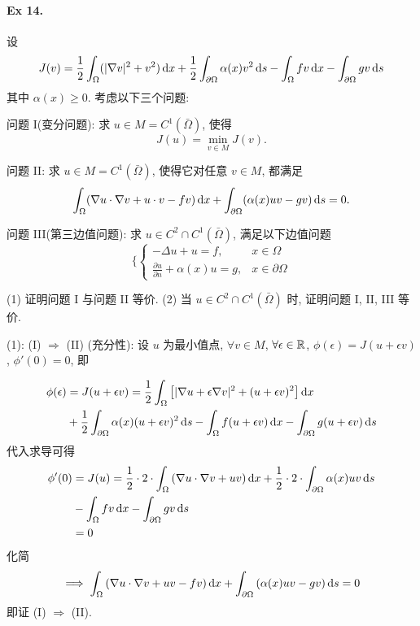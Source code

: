 \paragraph{Ex 14.}
设
\[
J(v) = \frac{1}{2} \int_{\Omega} (|\nabla v|^2 + v^2)\operatorname{d\!} x
+ \frac{1}{2} \int_{\partial \Omega} \alpha(x) v^2 \operatorname{d\!} s
- \int_{\Omega} fv \operatorname{d\!} x - \int_{\partial \Omega} gv \operatorname{d\!} s
\]
其中 $\alpha(x) \geq 0$. 考虑以下三个问题:

问题 I(变分问题): 求 $u \in M = C^1(\bar \Omega)$, 使得
\[
J(u)= \min_{v \in M} J(v).
\]

问题 II: 求 $u \in M = C^1(\bar \Omega)$, 使得它对任意 $v \in M$, 都满足
\[
\int_{\Omega} (\nabla u \cdot \nabla v + u \cdot v - fv)\operatorname{d\!} x
+ \int_{\partial \Omega} (\alpha(x) uv-gv )\operatorname{d\!} s = 0.
\]

问题 III(第三边值问题): 求 $u \in C^2 \cap C^1(\bar \Omega)$, 满足以下边值问题
\[\{
\begin{cases}
- \Delta u + u = f, & x \in \Omega \\
\frac{\partial u}{\partial n} + \alpha (x) u = g, & x \in \partial \Omega
\end{cases}
\]

(1) 证明问题 I 与问题 II 等价.
(2) 当 $u \in C^2 \cap C^1(\bar \Omega)$ 时, 证明问题 I, II, III 等价.

\solproof (1): (I) $\Rightarrow$ (II) (充分性):
设 $u$ 为最小值点, $\forall v \in M$, $\forall \epsilon \in {\mathbb R}$,
$\phi(\epsilon) = J(u + \epsilon v)$, $\phi'(0) = 0$, 即

\[ \begin{aligned}
\phi(\epsilon) &= J(u + \epsilon v) = \frac12 \int_\Omega 
  \left[ |\nabla u + \epsilon \nabla v|^2 + (u + \epsilon v)^2 \right]
  \operatorname{d\!} x \\
&+ \frac12 \int_{\partial\Omega} \alpha(x) (u + \epsilon v)^2 \operatorname{d\!} s
  - \int_\Omega f(u + \epsilon v) \operatorname{d\!} x
  - \int_{\partial\Omega} g(u + \epsilon v) \operatorname{d\!} s
\end{aligned} \]
代入求导可得
\[ \begin{aligned}
\phi'(0) &= J(u) = \frac12\cdot 2\cdot \int_\Omega
    \left( \nabla u \cdot \nabla v + uv \right) \operatorname{d\!} x
  + \frac12\cdot 2\cdot \int_{\partial\Omega} \alpha(x)uv \operatorname{d\!} s \\
&- \int_\Omega fv\operatorname{d\!} x - \int_{\partial\Omega} gv\operatorname{d\!} s \\
&= 0
\end{aligned} \]
化简
\[ \implies
\int_\Omega \left( \nabla u \cdot \nabla v + uv -fv \right) \operatorname{d\!} x
+ \int_{\partial\Omega} \left( \alpha(x)uv - gv \right) \operatorname{d\!} s = 0
\]
即证 (I) $\Rightarrow$ (II).

